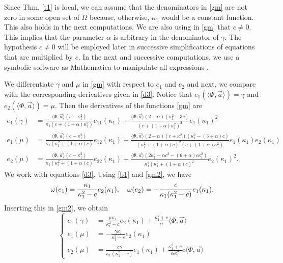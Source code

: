 \documentclass{birkjour}
\theoremstyle{definition}
\theoremstyle{remark}
\numberwithin{equation}{section}
\begin{document}
Since Thm. \ref{t1} is local, we can assume that the denominators in \eqref{gm} are not zero in some open set of $\Omega$ because, otherwise, $\kappa_1$ would be a constant function. This also holds in the next computations. We are also using in \eqref{gm} that $c\not=0$. This implies that the parameter $\alpha$ is arbitrary in the denominator of $\gamma$. The hypothesis $c\not=0$ will be employed later in successive simplifications of equations that are multiplied by $c$. In the next and successive   computations, we use a symbolic software as {\sc Mathematica} to manipulate all expressions \cite{wo}. 

We differentiate  $\gamma$ and $\mu$ in \eqref{gm} with respect to $e_1$ and $e_2$ and next, we compare with the corresponding derivatives given in \eqref{d3}.  Notice that  $e_1(\langle\Phi,\vec{a}\rangle)= \gamma$ and  $e_2(\langle\Phi,\vec{a}\rangle)= \mu$. Then the derivatives of the functions \eqref{gm} are
\begin{equation}\label{d4}
\begin{split}
 e_1(\gamma)&=\frac{\langle\Phi,\vec{a}\rangle(c-\kappa_1^2)}{\kappa_1  (c+(1+\alpha)\kappa_1^2)}e_{11}(\kappa_1)+\frac{ \langle \Phi,\vec{a}\rangle(2+\alpha)(\kappa_1^2-3 c)}{(c+(1+\alpha)\kappa_1^2)^2}e_1(\kappa_1)^2\\ 
 e_1(\mu)&=\frac{\langle\Phi,\vec{a}\rangle(c-\kappa_1^2 )}{ \kappa_1 (\kappa_1^2+(1+\alpha)c)}e_{12}(\kappa_1)+\frac{\langle\Phi,\vec{a}\rangle(2+\alpha)(c+\kappa_1^2)(\kappa_1^2-(3+\alpha)c)}{ (\kappa_1^2+(1+\alpha)c)^2(c+(1+\alpha)\kappa_1^2)}e_1(\kappa_1)e_2(\kappa_1)\\
 e_2(\mu)&=\frac{\langle\Phi,\vec{a}\rangle(c-\kappa_1^2 )}{ \kappa_1 (\kappa_1^2+(1+\alpha)c)}e_{22}(\kappa_1)+\frac{\langle\Phi,\vec{a}\rangle(2\kappa_1^4-\alpha c^2-(6+\alpha)c\kappa_1^2)}{  \kappa_1^2(\kappa_1^2+(1+\alpha)c)^2}e_2(\kappa_1)^2.
 \end{split}
 \end{equation}
We work with  equations   \eqref{d3}. Using \eqref{b1} and \eqref{gm2}, we have
\begin{equation*}
\omega(e_1)=\frac{\kappa_1}{\kappa_1^2-c}e_2(\kappa_1),\quad \omega(e_2)=-\frac{c}{\kappa_1(\kappa_1^2-c)}e_1(\kappa_1).\\
\end{equation*}
Inserting this in \eqref{gm2}, we obtain
    \begin{equation}\label{d5}
    \left\{
\begin{split}
e_{1}(\gamma)&=\frac{\mu\kappa_1}{\kappa_1^2-c}e_2(\kappa_1)+\frac{\kappa_1^2+c}{\alpha }\langle\Phi,\vec{a}\rangle   \\
 e_{1}(\mu)&=-\frac{\gamma\kappa_1}{\kappa_1^2-c}e_2(\kappa_1)\\
 e_{2}(\mu)&=  \frac{c\gamma}{\kappa_1(\kappa_1^2-c)}e_1(\kappa_1)+\frac{\kappa_1^2+c}{\alpha\kappa_1^2}  c \langle\Phi,\vec{a}\rangle
      \end{split}\right.
   \end{equation}
\end{document}
